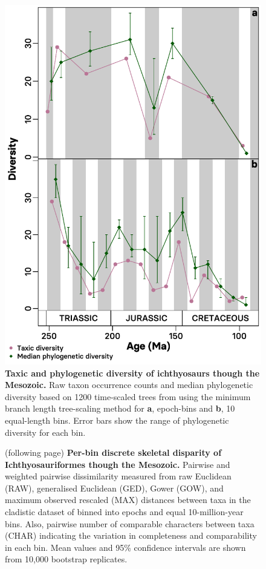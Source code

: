 \documentclass[british,a4paper]{article}
\begin{document}
\begin{figure}[h]
    \includegraphics[center]{supp_figures/figS2-mbl_diversity}
    \caption[Taxic and phylogenetic diversity of ichthyosaurs though the Mesozoic]{\textbf{Taxic and phylogenetic diversity of ichthyosaurs though the Mesozoic.} Raw taxon occurrence counts and median phylogenetic diversity based on 1200 time-scaled trees from \textcite{Moon2019a} using the minimum branch length tree-scaling method for \textbf{a}, epoch-bins and \textbf{b}, \SI{10}{\mega\annum} equal-length bins. Error bars show the range of phylogenetic diversity for each bin.\label{fig:mbl-diversity}}
\end{figure}

\begin{figure}[h]
    \caption[Per-bin discrete skeletal disparity of Ichthyosauriformes though the Mesozoic]{(following page) \textbf{Per-bin discrete skeletal disparity of Ichthyosauriformes though the Mesozoic.} Pairwise and weighted pairwise dissimilarity measured from raw Euclidean (RAW), generalised Euclidean (GED), Gower (GOW), and maximum observed rescaled (MAX) distances between taxa in the cladistic dataset of \textcite{Moon2019a} binned into epochs and equal 10-million-year bins. Also, pairwise number of comparable characters between taxa (CHAR) indicating the variation in completeness and comparability in each bin. Mean values and 95\% confidence intervals are shown from 10,000 bootstrap replicates.\label{fig:pairwise-disparity}} 
\end{figure} \FloatBarrier
\end{document}
